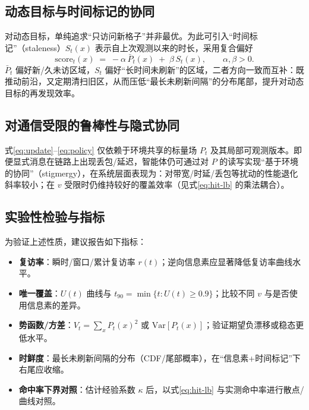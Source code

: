 \subsection{动态目标与时间标记的协同}
对动态目标，单纯追求“只访问新格子”并非最优。为此可引入“时间标记”（staleness）$S_t(x)$ 表示自上次观测以来的时长，采用复合偏好
\begin{equation}
\text{score}_t(x) \;=\; -\alpha\,\bar{P}_t(x)\;+\;\beta\,S_t(x),
\qquad \alpha,\beta>0.
\end{equation}
$\bar{P}_t$ 偏好新/久未访区域，$S_t$ 偏好“长时间未刷新”的区域，二者方向一致而互补：既推动前沿，又定期清扫旧区，从而压低“最长未刷新间隔”的分布尾部，提升对动态目标的再发现效率。

\subsection{对通信受限的鲁棒性与隐式协同}
式\eqref{eq:update}–\eqref{eq:policy} 仅依赖于环境共享的标量场 $P_t$ 及其局部可观测版本。即便显式消息在链路上出现丢包/延迟，智能体仍可通过对 $P$ 的读写实现“基于环境的协同”（stigmergy），在系统层面表现为：对带宽/时延/丢包等扰动的性能退化斜率较小；在 $v$ 受限时仍维持较好的覆盖效率（见式\eqref{eq:hit-lb} 的乘法耦合）。

\subsection{实验性检验与指标}
为验证上述性质，建议报告如下指标：
\begin{itemize}
    \item \textbf{复访率}：瞬时/窗口/累计复访率 $r(t)$；逆向信息素应显著降低复访率曲线水平。
    \item \textbf{唯一覆盖}：$U(t)$ 曲线与 $t_{90}=\min\{t:U(t)\ge 0.9\}$；比较不同 $v$ 与是否使用信息素的差异。
    \item \textbf{势函数/方差}：$V_t=\sum_x P_t(x)^2$ 或 $\mathrm{Var}[P_t(x)]$；验证期望负漂移或稳态更低水平。
    \item \textbf{时鲜度}：最长未刷新间隔的分布（CDF/尾部概率），在“信息素+时间标记”下右尾应收缩。
    \item \textbf{命中率下界对照}：估计经验系数 $\kappa$ 后，以式\eqref{eq:hit-lb} 与实测命中率进行散点/曲线对照。
\end{itemize}

